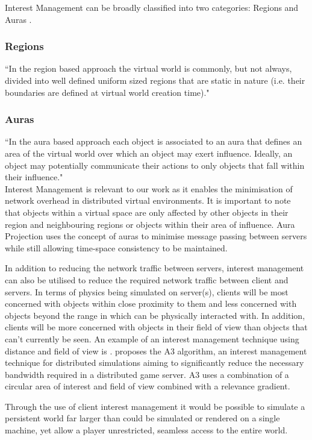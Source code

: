 Interest Management can be broadly classified into two categories: Regions and Auras \cite{Morgan2005, storey2004determining}.
\subsubsection{Regions}
``In the region based approach the virtual world is commonly, but not always, divided into well defined uniform sized regions that are static in nature (i.e. their boundaries are defined at virtual world creation time)."\cite{storey2004determining}
\subsubsection{Auras}
``In the aura based approach each object is associated to an aura that defines an area of the virtual world over which an object may exert influence. Ideally, an object may potentially communicate their actions to only objects that fall within their influence."\cite{storey2004determining}\\

Interest Management is relevant to our work as it enables the minimisation of network overhead in distributed virtual environments. It is important to note that objects within a virtual space are only affected by other objects in their region and neighbouring regions or objects within their area of influence. Aura Projection uses the concept of auras to minimise message passing between servers while still allowing time-space consistency to be maintained.

In addition to reducing the network traffic between servers, interest management can also be utilised to reduce the required network traffic between client and servers. In terms of physics being simulated on server(s), clients will be most concerned with objects within close proximity to them and less concerned with objects beyond the range in which can be physically interacted with. In addition, clients will be more concerned with objects in their field of view than objects that can't currently be seen. An example of an interest management technique using distance and field of view is \cite{Bezerra2008}. \cite{Bezerra2008} proposes the A3 algorithm, an interest management technique for distributed simulations aiming to significantly reduce the necessary bandwidth required in a distributed game server. A3 uses a combination of a circular area of interest and field of view combined with a relevance gradient.

Through the use of client interest management it would be possible to simulate a persistent world far larger than could be simulated or rendered on a single machine, yet allow a player unrestricted, seamless access to the entire world.


